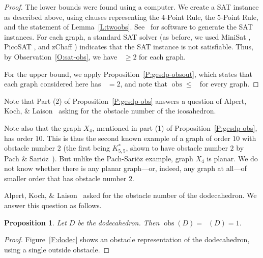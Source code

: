 \documentclass[12pt]{amsart}
\newtheorem{proposition}[theorem]{Proposition}
\theoremstyle{remark}
\DeclareMathOperator{\obs}{\ensuremath{\mathrm{obs}}}
\DeclareMathOperator{\obsout}{\ensuremath{\obs_\mathrm{out}}}
\begin{document}
\begin{proof}
The lower bounds were found using a computer.
We create a SAT instance as described above,
using clauses representing the $4$-Point Rule,
the $5$-Point Rule,
and the statement of Lemma~\ref{L:twoobs}.
See~\cite{Cha17} for software to generate the SAT instances.
For each graph,
a standard SAT solver
(as before,
we used MiniSat \cite{MiniSat}, PicoSAT \cite{PicoSAT},
and zChaff \cite{zChaff})
indicates that
the SAT instance is not satisfiable.
Thus, by Observation~\ref{O:sat-obs},
we have $\obsout \ge 2$ for each graph.

For the upper bound, we apply Proposition~\ref{P:gesdp-obsout},
which states that each graph considered here has $\obsout = 2$,
and note that $\obs \le \obsout$ for every graph.
\end{proof}

Note that
Part (2) of Proposition~\ref{P:gesdp-obs}
answers a question of
Alpert, Koch, \& Laison~\cite[p.~231]{AlpKocLai10}
asking for the obstacle number of the icosahedron.

Note also that the graph $X_{4}$,
mentioned in part (1) of Proposition~\ref{P:gesdp-obs},
has order $10$.
This is thus the second known example of a graph of order $10$
with obstacle number $2$
(the first being $K^*_{5,5}$,
shown to have obstacle number $2$ by
Pach \& Sari\"{o}z~\cite[Thm.~2.1]{PacSar11}).
But unlike the Pach-Sari\"{o}z example, graph $X_4$ is planar.
We do not know whether there is any planar graph---or,
indeed, any graph at all---of
smaller order
that has obstacle number $2$.

Alpert, Koch, \& Laison~\cite[p.~231]{AlpKocLai10}
asked for the obstacle number of the dodecahedron.
We answer this question as follows.
\begin{proposition} \label{dodec-obs}
Let $D$ be the dodecahedron.
Then $\obs(D) = \obsout(D) = 1$.
\end{proposition}
\begin{proof}
Figure~\ref{F:dodec}
shows an obstacle representation of the dodecahedron,
using a single outside obstacle.
\end{proof}
\end{document}
